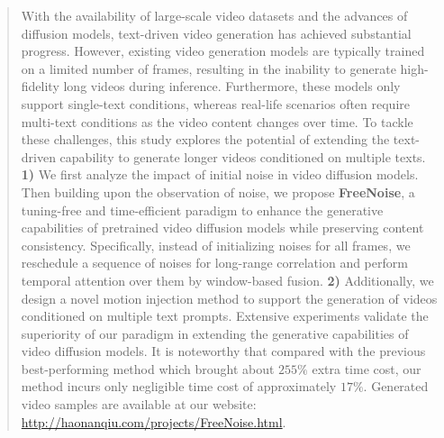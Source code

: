 \begin{abstract}
With the availability of large-scale video datasets and the advances of diffusion models, text-driven video generation has achieved substantial progress. However, existing video generation models are typically trained on a limited number of frames, resulting in the inability to generate high-fidelity long videos during inference. Furthermore, these models only support single-text conditions, whereas real-life scenarios often require multi-text conditions as the video content changes over time. To tackle these challenges, this study explores the potential of extending the text-driven capability to generate longer videos conditioned on multiple texts. \textbf{1)} We first analyze the impact of initial noise in video diffusion models. Then building upon the observation of noise, we propose \textbf{FreeNoise}, a tuning-free and time-efficient paradigm to enhance the generative capabilities of pretrained video diffusion models while preserving content consistency. Specifically, instead of initializing noises for all frames, we reschedule a sequence of noises for long-range correlation and perform temporal attention over them by window-based fusion. \textbf{2)} Additionally, we design a novel motion injection method to support the generation of videos conditioned on multiple text prompts. Extensive experiments validate the superiority of our paradigm in extending the generative capabilities of video diffusion models. It is noteworthy that compared with the previous best-performing method which brought about $255\%$ extra time cost, our method incurs only negligible time cost of approximately $17\%$. 
%
Generated video samples are available at our website: \href{http://haonanqiu.com/projects/FreeNoise.html}{http://haonanqiu.com/projects/FreeNoise.html}.
\end{abstract}